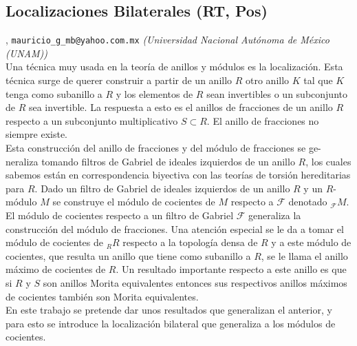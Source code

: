 \subsection{\sffamily Localizaciones Bilaterales {\footnotesize (RT, Pos)}} \label{reg-1455} 
, {\tt mauricio\_g\_mb@yahoo.com.mx}  {\slshape (Universidad Nacional Aut\'onoma de M\'exico (UNAM))}\\
          \noindent Una t\'ecnica muy usada en la teor\'ia de anillos y m\'odulos es la localizaci\'on. Esta t\'ecnica surge de querer construir a partir de un anillo $R$ otro anillo $K$ tal que $K$ tenga como subanillo a $R$ y los elementos de $R$ sean invertibles o un subconjunto de $R$ sea invertible. La respuesta a esto es el anillos de fracciones de un anillo $R$ respecto a un subconjunto multiplicativo $S\subset{R}$. El anillo de fracciones no siempre existe. \\Esta construcci\'on del anillo de fracciones y del m\'odulo de fracciones se ge-neraliza tomando filtros de Gabriel de ideales izquierdos de un anillo $R$, los cuales sabemos est\'an en correspondencia biyectiva con las teor\'ias de torsi\'on hereditarias para $R$. Dado un filtro de Gabriel de ideales izquierdos de un anillo $R$ y un $R$-m\'odulo $M$ se construye el m\'odulo de cocientes de $M$ respecto a $\mathcal{F}$ denotado $_\mathcal{F}M$. \\El m\'odulo de cocientes respecto a un filtro de Gabriel $\mathcal{F}$ generaliza la construcci\'on del m\'odulo de fracciones. Una atenci\'on especial se le da a tomar el m\'odulo de cocientes de $_RR$ respecto a la topolog\'ia densa de $R$ y a este m\'odulo de cocientes, que resulta un anillo que tiene como subanillo a $R$, se le llama el anillo m\'aximo de cocientes de $R$. Un resultado importante respecto a este anillo es que si $R$ y $S$ son anillos Morita equivalentes entonces sus respectivos anillos m\'aximos de cocientes tambi\'en son Morita equivalentes. \\ En este trabajo se pretende dar unos resultados que generalizan el anterior, y para esto se introduce la localizaci\'on bilateral que generaliza a los m\'odulos de cocientes.
